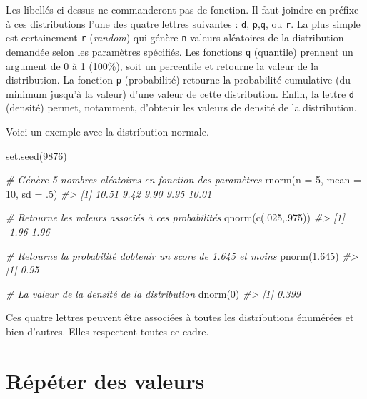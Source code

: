 \documentclass[
]{book}
\newenvironment{Shaded}{}{}
\newcommand{\AttributeTok}[1]{#1}
\newcommand{\CommentTok}[1]{\textit{#1}}
\newcommand{\DecValTok}[1]{#1}
\newcommand{\FloatTok}[1]{#1}
\newcommand{\FunctionTok}[1]{#1}
\newcommand{\NormalTok}[1]{#1}
\begin{document}
Les libellés ci-dessus ne commanderont pas de fonction. Il faut joindre en préfixe à ces distributions l'une des quatre lettres suivantes : \texttt{d}, \texttt{p},\texttt{q}, ou \texttt{r}. La plus simple est certainement \texttt{r} (\emph{random}) qui génère \texttt{n} valeurs aléatoires de la distribution demandée selon les paramètres spécifiés. Les fonctions \texttt{q} (quantile) prennent un argument de 0 à 1 (100\%), soit un percentile et retourne la valeur de la distribution. La fonction \texttt{p} (probabilité) retourne la probabilité cumulative (du minimum jusqu'à la valeur) d'une valeur de cette distribution. Enfin, la lettre \texttt{d} (densité) permet, notamment, d'obtenir les valeurs de densité de la distribution.

Voici un exemple avec la distribution normale.

\begin{Shaded}
\begin{Highlighting}[]
\FunctionTok{set.seed}\NormalTok{(}\DecValTok{9876}\NormalTok{)}

\CommentTok{\# Génère 5 nombres aléatoires en fonction des paramètres}
\FunctionTok{rnorm}\NormalTok{(}\AttributeTok{n =} \DecValTok{5}\NormalTok{, }\AttributeTok{mean =} \DecValTok{10}\NormalTok{, }\AttributeTok{sd =}\NormalTok{ .}\DecValTok{5}\NormalTok{)}
\CommentTok{\#\textgreater{} [1] 10.51  9.42  9.90  9.95 10.01}

\CommentTok{\# Retourne les valeurs associés à ces probabilités}
\FunctionTok{qnorm}\NormalTok{(}\FunctionTok{c}\NormalTok{(.}\DecValTok{025}\NormalTok{,.}\DecValTok{975}\NormalTok{))}
\CommentTok{\#\textgreater{} [1] {-}1.96  1.96}

\CommentTok{\# Retourne la probabilité d\textquotesingle{}obtenir un score de 1.645 et moins}
\FunctionTok{pnorm}\NormalTok{(}\FloatTok{1.645}\NormalTok{)}
\CommentTok{\#\textgreater{} [1] 0.95}

\CommentTok{\# La valeur de la densité de la distribution}
\FunctionTok{dnorm}\NormalTok{(}\DecValTok{0}\NormalTok{)}
\CommentTok{\#\textgreater{} [1] 0.399}
\end{Highlighting}
\end{Shaded}

Ces quatre lettres peuvent être associées à toutes les distributions énumérées et bien d'autres. Elles respectent toutes ce cadre.

\hypertarget{ruxe9puxe9ter-des-valeurs}{%
\section{Répéter des valeurs}\label{ruxe9puxe9ter-des-valeurs}}
\end{document}
